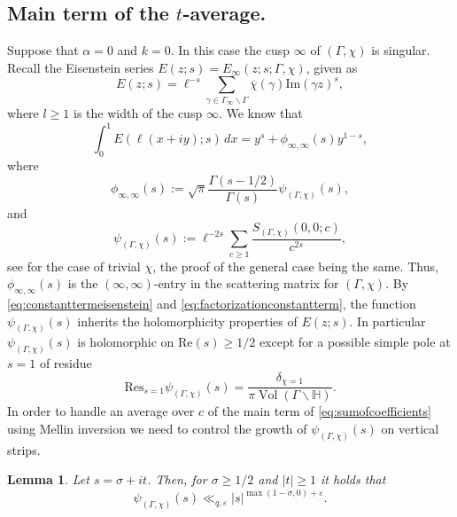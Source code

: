 \documentclass{article}
\newtheorem{lem}[thm]{Lemma}
\theoremstyle{named}
\newcommand{\Hyp}{\mathbb{H}}
\DeclareMathOperator{\vol}{Vol}
\begin{document}
\subsection{Main term of the $t$-average.}

Suppose that $\alpha = 0$ and $k = 0$. In this case the cusp $\infty$ of $(\Gamma, \chi)$ is singular. Recall the Eisenstein series $E(z; s) =E_\infty(z; s; \Gamma, \chi)$, given as
\begin{equation*}
    E(z; s) = \ell^{-s}\sum_{\gamma \in \Gamma_\infty \backslash \Gamma} \overline{\chi}(\gamma)\text{Im}(\gamma z)^s,
\end{equation*}
where $l\geq 1$ is the width of the cusp $\infty$. We know that 
\begin{equation}\label{eq:constanttermeisenstein}
\int_{0}^{1}E(\ell(x + iy); s) \, dx = y^s +  \phi_{\infty, \infty}(s) y^{1-s}, 
\end{equation}
where 
\begin{equation}\label{eq:factorizationconstantterm}
    \phi_{\infty, \infty}(s) := \sqrt{\pi}\frac{\Gamma(s - 1/2)}{\Gamma(s)}\psi_{(\Gamma, \chi)}(s),
\end{equation}
and
\begin{equation*}
    \psi_{(\Gamma, \chi)}(s) := \ell^{-2s}\sum_{c \geq 1}\frac{S_{(\Gamma, \chi)}(0, 0; c)}{c^{2s}},
\end{equation*}
see \cite[Theorem 3.4]{iwaniec} for the case of trivial $\chi$, the proof of the general case being the same. Thus, $\phi_{\infty, \infty}(s)$ is the $(\infty, \infty)$-entry in the scattering matrix for $(\Gamma, \chi)$. By \eqref{eq:constanttermeisenstein} and \eqref{eq:factorizationconstantterm}, the function $\psi_{(\Gamma, \chi)}(s)$ inherits the holomorphicity properties of $E(z; s)$. In particular $\psi_{(\Gamma, \chi)}(s)$ is holomorphic on $\text{Re}(s) \geq 1/2$ except for a possible simple pole at $s = 1$ of residue
\begin{equation*}
    \text{Res}_{s = 1}\psi_{(\Gamma, \chi)}(s) = \frac{\delta_{\chi = 1}}{\pi \vol(\Gamma\backslash \Hyp)}.
\end{equation*}
In order to handle an average over $c$ of the main term of \eqref{eq:sumofcoefficients} using Mellin inversion we need to control the growth of $\psi_{(\Gamma, \chi)}(s)$ on vertical strips.
\begin{lem}\label{lem:growthofconstantterm}
Let $s = \sigma + it$. Then, for $\sigma \geq 1/2$ and $|t| \geq 1$ it holds that 
\begin{equation*}
    \psi_{(\Gamma, \chi)}(s) \ll_{q, \varepsilon} |s|^{\max(1-\sigma, 0) + \varepsilon}.
\end{equation*}
\end{lem}
\end{document}
